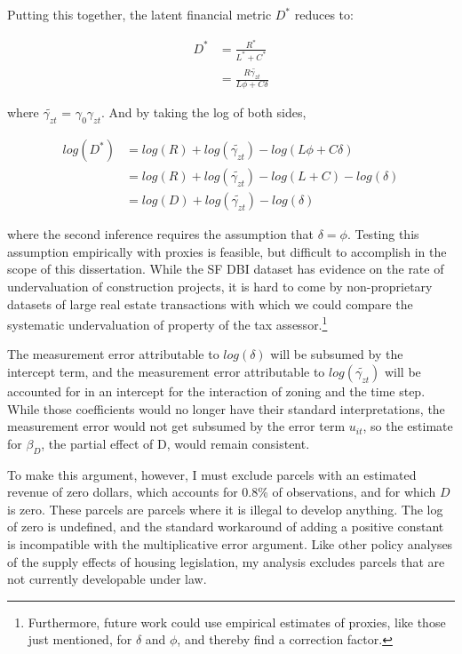 \documentclass[a4paper,12pt]{article}
\begin{document}
Putting this together, the latent financial metric $D^*$ reduces to:

\begin{align*}
D^* &= \frac{R^*}{L^* + C^*} \\
 &= \frac{R \tilde{\gamma_{zt}}}{L \phi + C \delta}
\end{align*}

where $\tilde{\gamma_{zt}}$ = $\gamma_{0}\gamma_{zt}$. And by taking the log of both sides, 

\begin{align*}
log(D^*) &= log(R) + log(\tilde{\gamma_{zt}}) - log({L \phi + C \delta}) \\
 &= log(R) + log(\tilde{\gamma_{zt}}) - log(L + C) - log(\delta) \\
  &= log(D) + log(\tilde{\gamma_{zt}}) - log(\delta)
\end{align*}

where the second inference requires the assumption that $\delta = \phi$. Testing this assumption empirically with proxies is feasible, but difficult to accomplish in the scope of this dissertation. While the SF DBI dataset has evidence on the rate of undervaluation of construction projects, it is hard to come by non-proprietary datasets of large real estate transactions with which we could compare the systematic undervaluation of property of the tax assessor.\footnote{Furthermore, future work could use empirical estimates of proxies, like those just mentioned, for $\delta$ and $\phi$, and thereby find a correction factor.}

The measurement error attributable to $log(\delta)$ will be subsumed by the intercept term, and the measurement error attributable to $log(\tilde{\gamma_{zt}})$ will be accounted for in an intercept for the interaction of zoning and the time step. While those coefficients would no longer have their standard interpretations, the measurement error would not get subsumed by the error term $u_{it}$, so the estimate for $\beta_{D}$, the partial effect of D, would remain consistent.

To make this argument, however, I must exclude parcels with an estimated revenue of zero dollars, which accounts for 0.8\% of observations, and for which $D$ is zero. These parcels are parcels where it is illegal to develop anything. The log of zero is undefined, and the standard workaround of adding a positive constant is incompatible with the multiplicative error argument. Like other policy analyses of the supply effects of housing legislation, my analysis excludes parcels that are not currently developable under law.
\end{document}
